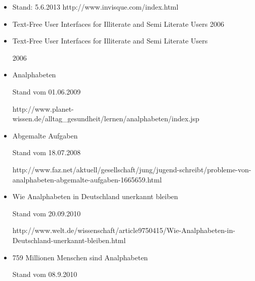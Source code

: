 \begin{itemize}
	 \item {}
						{Stand: 5.6.2013}
						{http://www.invisque.com/index.html}{}

	 \item {}
					{Text-Free User Interfaces for Illiterate and Semi Literate Users}
					{2006}
					{}



 	 \item {}

					{Text-Free User Interfaces for Illiterate and Semi Literate Users}

										{2006}

										{}



	\item {}

										{Analphabeten}

										{Stand vom 01.06.2009}

										{http://www.planet-wissen.de/alltag_gesundheit/lernen/analphabeten/index.jsp}

										


	\item {}

										{Abgemalte Aufgaben}

										{Stand vom 18.07.2008}

										{http://www.faz.net/aktuell/gesellschaft/jung/jugend-schreibt/probleme-von-analphabeten-abgemalte-aufgaben-1665659.html}									


	\item {}

										{Wie Analphabeten in Deutschland unerkannt bleiben}

										{Stand vom 20.09.2010}

										{http://www.welt.de/wissenschaft/article9750415/Wie-Analphabeten-in-Deutschland-unerkannt-bleiben.html}	


	\item {}

										{759 Millionen Menschen sind Analphabeten}

										{Stand vom 08.9.2010}


\end{itemize}
